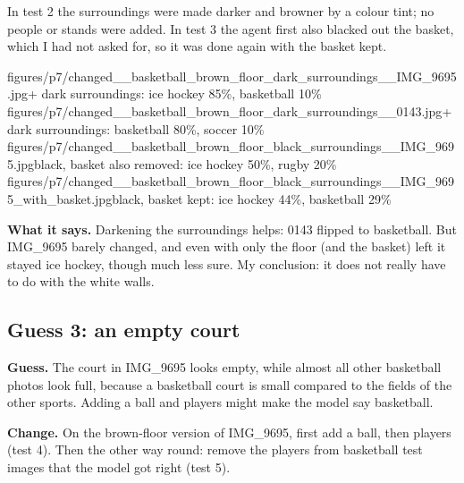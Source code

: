 \documentclass[11pt]{article}
\begin{document}
In test 2 the surroundings were made darker and browner by a colour tint; no
people or stands were added. In test 3 the agent first also blacked out the basket,
which I had not asked for, so it was done again with the basket kept.

           {figures/p7/changed__basketball_brown_floor_dark_surroundings__IMG_9695.jpg}{+ dark surroundings: ice hockey 85\%, basketball 10\%}
           {figures/p7/changed__basketball_brown_floor_dark_surroundings__0143.jpg}{+ dark surroundings: basketball 80\%, soccer 10\%}
           {figures/p7/changed__basketball_brown_floor_black_surroundings__IMG_9695.jpg}{black, basket also removed: ice hockey 50\%, rugby 20\%}
           {figures/p7/changed__basketball_brown_floor_black_surroundings__IMG_9695_with_basket.jpg}{black, basket kept: ice hockey 44\%, basketball 29\%}

\textbf{What it says.} Darkening the surroundings helps: 0143 flipped to
basketball. But IMG\_9695 barely changed, and even with only the floor (and the
basket) left it stayed ice hockey, though much less sure. My conclusion: it does
not really have to do with the white walls.

\subsection*{Guess 3: an empty court}

\textbf{Guess.} The court in IMG\_9695 looks empty, while almost all other
basketball photos look full, because a basketball court is small compared to the
fields of the other sports. Adding a ball and players might make the model say
basketball.

\textbf{Change.} On the brown-floor version of IMG\_9695, first add a ball, then
players (test 4). Then the other way round: remove the players from basketball
test images that the model got right (test 5).
\end{document}

